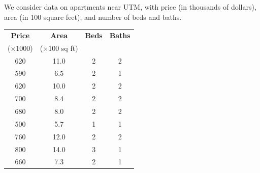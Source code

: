 \begin{example}
We consider data on apartments near UTM, with price (in thousands of dollars), area (in 100 square feet), and number of beds and baths.

\begin{center}
\begin{tabular}{cccc}
\toprule
\textbf{Price} & \textbf{Area} & \textbf{Beds} & \textbf{Baths} \\
($\times 1000$) & ($\times 100$ sq ft) & & \\
\midrule
620 & 11.0 & 2 & 2 \\
590 & 6.5  & 2 & 1 \\
620 & 10.0 & 2 & 2 \\
700 & 8.4  & 2 & 2 \\
680 & 8.0  & 2 & 2 \\
500 & 5.7  & 1 & 1 \\
760 & 12.0 & 2 & 2 \\
800 & 14.0 & 3 & 1 \\
660 & 7.3  & 2 & 1 \\
\bottomrule
\end{tabular}
\end{center}


\end{example}
